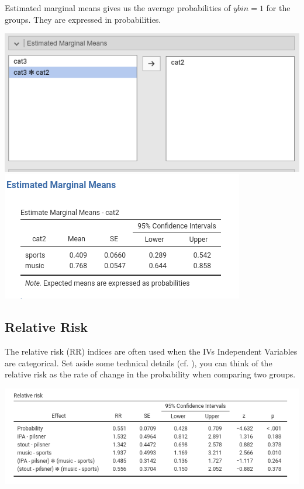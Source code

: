 \documentclass[
]{book}
\begin{document}
Estimated marginal means gives us the average probabilities of \(ybin=1\) for the groups. They are expressed in probabilities.

\includegraphics{bookletpics/3_logistic_input7.png}
\includegraphics{bookletpics/3_logistic_output9.png}

\hypertarget{relative-risk}{%
\subsection{Relative Risk}\label{relative-risk}}

The relative risk (RR) indices are often used when the {IVs {Independent Variables} } are categorical. Set aside some technical details (cf. \citet{zou2004modified}), you can think of the relative risk as the rate of change in the probability when comparing two groups.

\includegraphics{bookletpics/3_logistic_output10.png}
\end{document}
